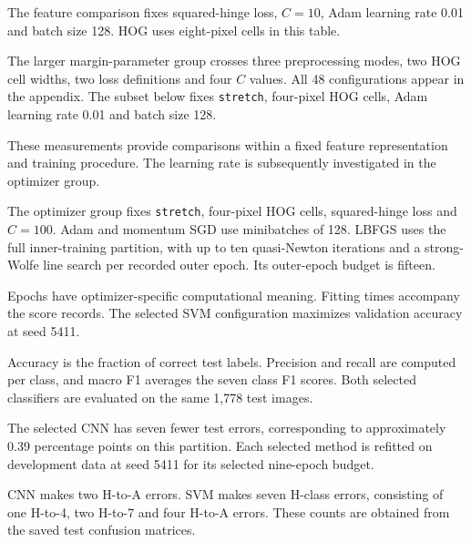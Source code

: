 The feature comparison fixes squared-hinge loss, $C=10$, Adam learning rate 0.01 and batch size 128. HOG uses eight-pixel cells in this table.

The larger margin-parameter group crosses three preprocessing modes, two HOG cell widths, two loss definitions and four $C$ values. All 48 configurations appear in the appendix. The subset below fixes \texttt{stretch}, four-pixel HOG cells, Adam learning rate 0.01 and batch size 128.

These measurements provide comparisons within a fixed feature representation and training procedure. The learning rate is subsequently investigated in the optimizer group.

The optimizer group fixes \texttt{stretch}, four-pixel HOG cells, squared-hinge loss and $C=100$. Adam and momentum SGD use minibatches of 128. LBFGS uses the full inner-training partition, with up to ten quasi-Newton iterations and a strong-Wolfe line search per recorded outer epoch. Its outer-epoch budget is fifteen.

Epochs have optimizer-specific computational meaning. Fitting times accompany the score records. The selected SVM configuration maximizes validation accuracy at seed 5411.

Accuracy is the fraction of correct test labels. Precision and recall are computed per class, and macro F1 averages the seven class F1 scores. Both selected classifiers are evaluated on the same 1,778 test images.

The selected CNN has seven fewer test errors, corresponding to approximately 0.39 percentage points on this partition. Each selected method is refitted on development data at seed 5411 for its selected nine-epoch budget.

CNN makes two H-to-A errors. SVM makes seven H-class errors, consisting of one H-to-4, two H-to-7 and four H-to-A errors. These counts are obtained from the saved test confusion matrices.


